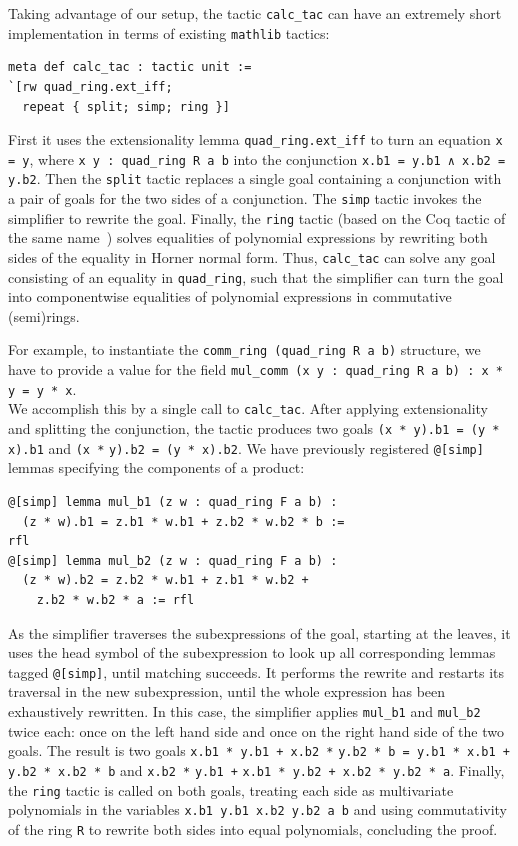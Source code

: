 \documentclass[sigplan,10pt,nonacm,
screen]{acmart} \settopmatter{printfolios=true,printccs=false,printacmref=false}
\newcommand{\mathlib}{\lstinline{mathlib}\xspace}
\begin{document}
Taking advantage of our setup, the tactic \lstinline{calc_tac} can have an extremely short implementation in terms of existing \mathlib tactics:
\begin{lstlisting}
meta def calc_tac : tactic unit :=
`[rw quad_ring.ext_iff;
  repeat { split; simp; ring }]
\end{lstlisting}
First it uses the extensionality lemma \lstinline{quad_ring.ext_iff} to turn an equation \lstinline{x = y},
where \lstinline{x y : quad_ring R a b} into the conjunction \lstinline{x.b1 = y.b1 ∧ x.b2 = y.b2}.
Then the \lstinline{split} tactic replaces a single goal containing a conjunction with a pair of goals for the two sides of a conjunction.
The \lstinline{simp} tactic invokes the simplifier to rewrite the goal.
Finally, the \lstinline{ring} tactic (based on the Coq tactic of the same name~\cite{ring-tactic}) solves equalities of polynomial expressions by rewriting both sides of the equality in Horner normal form.
Thus, \lstinline{calc_tac} can solve any goal consisting of an equality in \lstinline{quad_ring}, such that the simplifier can turn the goal into componentwise equalities of polynomial expressions in commutative (semi)rings.

For example, to instantiate the \lstinline{comm_ring (quad_ring R a b)} structure, we have to provide a value for the field \lstinline{mul_comm (x y : quad_ring R a b) : x * y = y * x}.\\
We accomplish this by a single call to \lstinline{calc_tac}.
After applying extensionality and splitting the conjunction, the tactic produces two goals \lstinline{(x * y).b1 = (y * x).b1} and \lstinline{(x *} \lstinline{y).b2 = (y * x).b2}. %
We have previously registered \lstinline{@[simp]} lemmas specifying the components of a product:
\begin{lstlisting}
@[simp] lemma mul_b1 (z w : quad_ring F a b) :
  (z * w).b1 = z.b1 * w.b1 + z.b2 * w.b2 * b :=
rfl
@[simp] lemma mul_b2 (z w : quad_ring F a b) :
  (z * w).b2 = z.b2 * w.b1 + z.b1 * w.b2 +
    z.b2 * w.b2 * a := rfl
\end{lstlisting}
As the simplifier traverses the subexpressions of the goal, starting at the leaves, it uses the head symbol of the subexpression to look up all corresponding lemmas tagged \lstinline{@[simp]}, until matching succeeds.
It performs the rewrite and restarts its traversal in the new subexpression,
until the whole expression has been exhaustively rewritten.
In this case, the simplifier applies \lstinline{mul_b1} and \lstinline{mul_b2} twice each: once on the left hand side and once on the right hand side of the two goals.
The result is two goals \lstinline{x.b1 * y.b1 + x.b2 *} %
\lstinline{y.b2 * b = y.b1 * x.b1 + y.b2 * x.b2 * b} and \lstinline{x.b2 *} \lstinline{y.b1 +} %
\lstinline{x.b1 * y.b2 + x.b2 * y.b2 * a}.
Finally, the \lstinline{ring} tactic is called on both goals,
treating each side as multivariate polynomials in the variables \lstinline{x.b1 y.b1 x.b2 y.b2 a b}
and using commutativity of the ring \lstinline{R} to rewrite both sides into equal polynomials,
concluding the proof.
\end{document}

